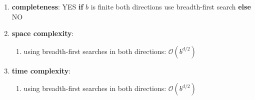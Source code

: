 \begin{enumerate}
\begin{enumerate}
        \item \textbf{completeness}: YES \textbf{if} $b$ is finite  both directions use breadth-first search \textbf{else} NO
        \hfill \cite{ai/book/Artificial-Intelligence-A-Modern-Approach/Russell-Norvig}

        \item \textbf{space complexity}:
        \begin{enumerate}
            \item using breadth-first searches in both directions: $\mathcal{O}(b^{d/2})$
            \hfill \cite{ai/book/Artificial-Intelligence-A-Modern-Approach/Russell-Norvig}
        \end{enumerate}

        \item \textbf{time complexity}:
        \begin{enumerate}
            \item using breadth-first searches in both directions: $\mathcal{O}(b^{d/2})$
            \hfill \cite{ai/book/Artificial-Intelligence-A-Modern-Approach/Russell-Norvig}
        \end{enumerate}
    \end{enumerate}
\end{enumerate}






















